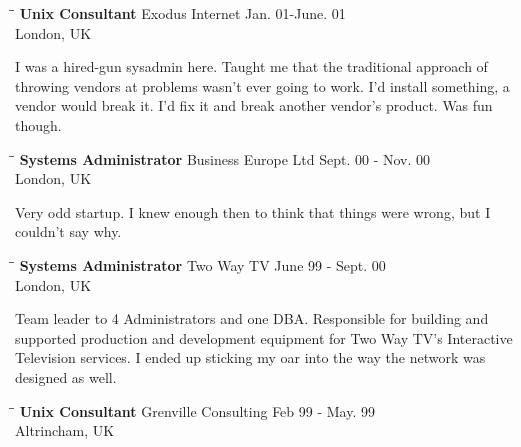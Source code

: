 \documentclass{res}
\begin{document}
\begin{resume}
	\begin{tabbing}
	   \hspace{2.3in}\= \hspace{2.6in}\= \kill %
	    {\bf Unix Consultant} \>Exodus Internet \> Jan. 01-June. 01\\
	                          \>London, UK
	\end{tabbing}\vspace{-20pt}
	I was a hired-gun sysadmin here.  Taught me that the traditional approach of throwing vendors at problems wasn't ever going to work.  I'd install something, a vendor would break it.  I'd fix it and break another vendor's product.  Was fun though.
	
	\begin{tabbing}
	   \hspace{2.3in}\= \hspace{2.6in}\= \kill %
	    {\bf Systems Administrator} \>Business Europe Ltd \> Sept. 00 - Nov. 00\\
	                          \>London, UK
	\end{tabbing}\vspace{-20pt}
	
	Very odd startup.  I knew enough then to think that things were wrong, but I couldn't say why.
	\begin{tabbing}
	   \hspace{2.3in}\= \hspace{2.6in}\= \kill %
	    {\bf Systems Administrator} \>Two Way TV \> June 99 - Sept. 00\\
	                          \>London, UK
	\end{tabbing}\vspace{-20pt}
	Team leader to 4 Administrators and one DBA. Responsible for building and supported production and development equipment for Two Way TV's Interactive Television services.  I ended up sticking my oar into the way the network was designed as well.
	
	\begin{tabbing}
	   \hspace{2.3in}\= \hspace{2.6in}\= \kill %
	    {\bf Unix Consultant} \>Grenville Consulting \> Feb 99 - May. 99\\
	                          \>Altrincham, UK
	\end{tabbing}\vspace{-20pt}
	

\end{resume}
\end{document}
